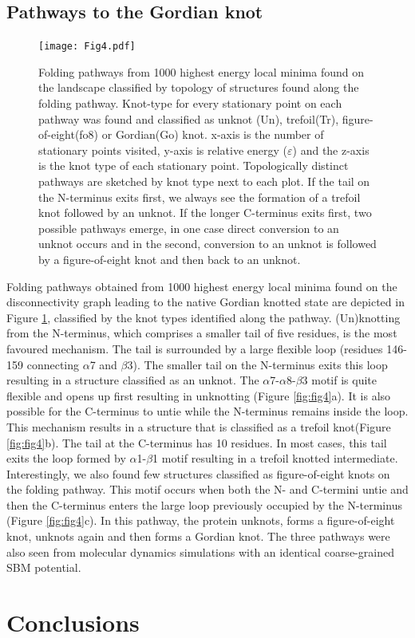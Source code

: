 \documentclass[journal=jacsat]{achemso}
\begin{document}
\subsection{Pathways to the	Gordian knot}
\begin{figure}
    \centering
    \texttt{[image: Fig4.pdf]}
    \caption{Folding pathways from 1000 highest energy local minima found on the landscape classified by topology of structures found along the folding pathway. Knot-type for every stationary point on each pathway was found and classified as unknot (Un), trefoil(Tr), figure-of-eight(fo8) or Gordian(Go) knot. x-axis is the number of stationary points visited, y-axis is relative energy ($\varepsilon$) and the z-axis is the knot type of each stationary point. Topologically distinct pathways are sketched by knot type next to each plot. If the tail on the N-terminus exits first, we always see the formation of a trefoil knot followed by an unknot. If the longer C-terminus exits first, two possible pathways emerge, in one case direct conversion to an unknot occurs and in the second, conversion to an unknot is followed by a figure-of-eight knot and then back to an unknot.}
    \label{fig:fig3}
\end{figure}
Folding pathways obtained from 1000 highest energy local minima found on the disconnectivity graph leading to the native Gordian knotted state are depicted in Figure \ref{fig:fig3}, classified by the knot types identified along the pathway. (Un)knotting from the N-terminus, which comprises a smaller tail of five residues, is the most favoured mechanism. The tail is surrounded by a large flexible loop (residues 146-159 connecting $\alpha$7 and $\beta$3). The smaller tail on the N-terminus exits this loop resulting in a structure classified as an unknot. The $\alpha$7-$\alpha$8-$\beta$3 motif is quite flexible and opens up first resulting in unknotting (Figure \ref{fig:fig4}a). It is also possible for the C-terminus to untie while the N-terminus remains inside the loop. This mechanism results in a structure that is classified as a trefoil knot(Figure \ref{fig:fig4}b). The tail at the C-terminus has 10 residues. In most cases, this tail exits the loop formed by $\alpha$1-$\beta$1 motif resulting in a trefoil knotted intermediate. Interestingly, we also found few structures classified as figure-of-eight knots on the folding pathway. This motif occurs when both the N- and C-termini untie and then the C-terminus enters the large loop previously occupied by the N-terminus (Figure \ref{fig:fig4}c). In this pathway, the protein unknots, forms a figure-of-eight knot, unknots again and then forms a Gordian knot. The three pathways were also seen from molecular dynamics simulations with an identical coarse-grained SBM potential\cite{Zhao18a}. 





\section{Conclusions}



%

\end{document}
